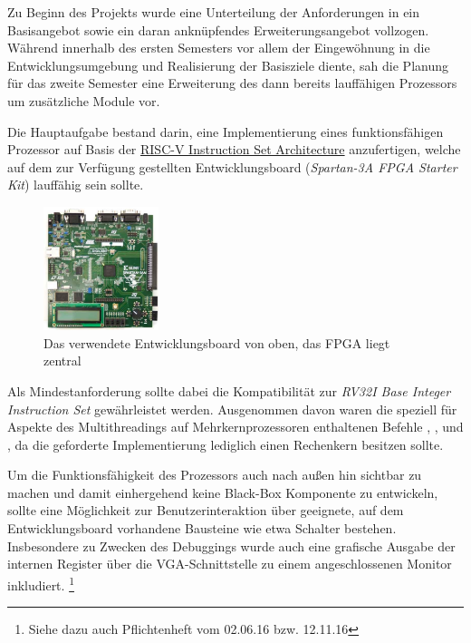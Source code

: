 Zu Beginn des Projekts wurde eine Unterteilung der Anforderungen in ein
Basisangebot sowie ein daran ankn\"upfendes Erweiterungsangebot vollzogen.
W\"ahrend innerhalb des ersten Semesters vor allem der
Eingew\"ohnung in die Entwicklungsumgebung und Realisierung der Basisziele diente,
sah die Planung f\"ur das zweite Semester eine Erweiterung des dann bereits
lauff\"ahigen Prozessors um zus\"atzliche Module vor. 

Die Hauptaufgabe bestand darin, eine Implementierung eines funktionsf\"ahigen
Prozessor auf Basis der
\href{https://riscv.org/specifications/}{RISC-V Instruction Set Architecture}
anzufertigen, welche auf dem zur Verf\"ugung gestellten Entwicklungsboard
(\textit{Spartan-3A FPGA Starter Kit}) lauff\"ahig sein sollte.

\begin{figure}[H]
\centering
\includegraphics[width=0.3\textwidth]{Board.png}
\caption{Das verwendete Entwicklungsboard von oben, das FPGA liegt zentral}
\label{fig:board}
\end{figure}

Als Mindestanforderung sollte dabei die Kompatibilit\"at zur
\textit{RV32I Base Integer Instruction Set} gew\"ahrleistet werden. Ausgenommen
davon waren die speziell f\"ur Aspekte des Multithreadings auf
Mehrkernprozessoren enthaltenen Befehle , ,
 und , da die geforderte Implementierung lediglich
einen Rechenkern besitzen sollte.

Um die Funktionsf\"ahigkeit des Prozessors auch nach au\ss{}en hin sichtbar zu
machen und damit einhergehend keine Black-Box Komponente zu entwickeln, sollte
eine M\"oglichkeit zur Benutzerinteraktion \"uber geeignete, auf dem
Entwicklungsboard vorhandene Bausteine wie etwa Schalter bestehen. Insbesondere
zu Zwecken des Debuggings wurde auch eine grafische Ausgabe der internen
Register \"uber die VGA-Schnittstelle zu einem angeschlossenen Monitor
inkludiert.
\footnote{Siehe dazu auch Pflichtenheft vom 02.06.16 bzw. 12.11.16}

